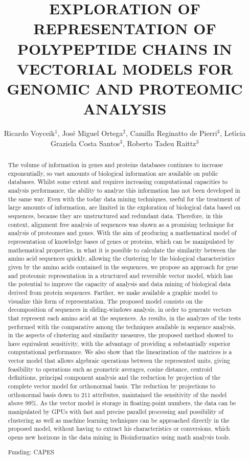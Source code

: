 \documentclass[twoside]{article}
\title{\vspace{-15mm}\fontsize{24pt}{10pt}\selectfont\textbf{EXPLORATION OF REPRESENTATION OF POLYPEPTIDE CHAINS IN VECTORIAL MODELS FOR GENOMIC AND PROTEOMIC ANALYSIS}} %
\author{Ricardo Voyceik$^1$, Jos\'e Miguel Ortega$^2$, Camilla Reginatto de Pierri$^3$, Let\'{\i}cia Graziela Costa Santos$^3$, Roberto Tadeu Raittz$^3$}
\affil{1 UFMG\\ 2 UFMG, LABORAT\'ORIO DE BIODADOS\\ 3 UFPR\\ }
\date{}
\begin{document}
\maketitle %

\thispagestyle{fancy} %


\begin{abstract}
The volume of information in genes and proteins databases continues to increase exponentially, so vast amounts of biological information are available on public databases. Whilst some extent and requires increasing computational capacities to analysis performance, the ability to analyze this information has not been developed in the same way. Even with the today data mining techniques, useful for the treatment of large amounts of information, are limited in the exploration of biological data based on sequences, because they are unstructured and redundant data. Therefore, in this context, alignment free analysis of sequences was shown as a promising technique for analysis of proteomes and genes. With the aim of producing a mathematical model of representation of knowledge bases of genes or proteins, which can be manipulated by mathematical properties, in what it is possible to calculate the similarity between the amino acid sequences quickly, allowing the clustering by the biological characteristics given by the amino acids contained in the sequences, we propose an approach for gene and proteomic representation in a structured and reversible vector model, which has the potential to improve the capacity of analysis and data mining of biological data derived from protein sequences. Farther, we make available a graphic model to visualize this form of representation. The proposed model consists on the decomposition of sequences in sliding-windows analysis, in order to generate vectors that represent each amino acid at the sequences. As results, in the analyzes of the tests performed with the comparative among the techniques available in sequence analysis, in the aspects of clustering and similarity measures, the proposed method showed to have equivalent sensitivity, with the advantage of providing a substantially superior computational performance. We also show that the linearization of the matrices is a vector model that allows algebraic operations between the represented units, giving feasibility to operations such as geometric averages, cosine distance, centroid definitions, principal component analysis and the reduction by projection of the complete vector model for orthonormal basis. The reduction by projections to orthonormal basis down to 211 attributes, maintained the sensitivity of the model above 99\%. As the vector model is storage in floating-point numbers, the data can be manipulated by GPUs with fast and precise parallel processing and possibility of clustering as well as machine learning techniques can be approached directly in the proposed model, without having to extract his characteristics or conversions, which opens new horizons in the data mining in Bioinformatics using math analysis tools.

Funding: CAPES
\end{abstract}
\end{document}
